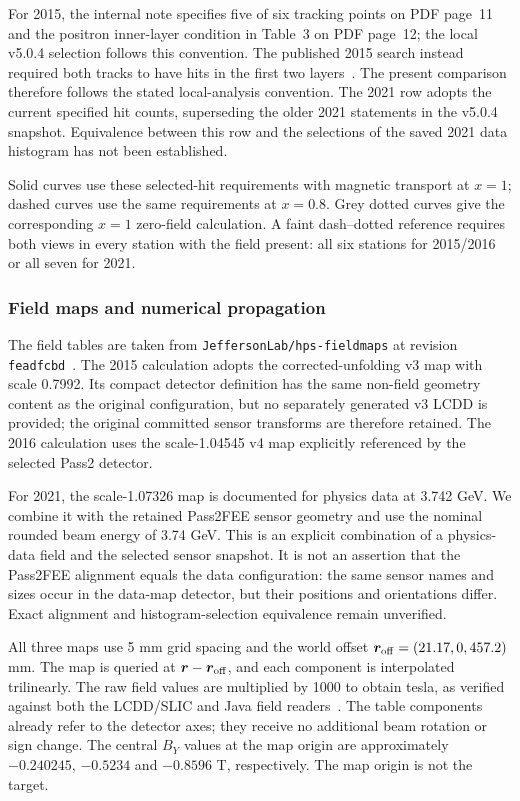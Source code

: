 For 2015, the internal note specifies five of six tracking points on PDF
page~11 and the positron inner-layer condition in Table~3 on PDF page~12;
the local v5.0.4 selection follows this convention. The published 2015
search instead required both tracks to have hits in the first two
layers~\cite{v571:HPS2015}. The present comparison therefore follows the
stated local-analysis convention. The 2021 row adopts the current specified
hit counts, superseding the older 2021 statements in the v5.0.4 snapshot.
Equivalence between this row and the selections of the saved 2021 data
histogram has not been established.

Solid curves use these selected-hit requirements with magnetic transport at
$x=1$; dashed curves use the same requirements at $x=0.8$. Grey dotted curves
give the corresponding $x=1$ zero-field calculation. A faint dash--dotted
reference requires both views in every station with the field present:
all six stations for 2015/2016 or all seven for 2021.

\subsubsection{Field maps and numerical propagation}
\label{v571:field-model}
The field tables are taken from \texttt{JeffersonLab/hps-fieldmaps} at
revision \texttt{feadfcbd}~\cite{v571:fieldmaps}. The 2015 calculation adopts
the corrected-unfolding v3 map with scale 0.7992. Its compact detector
definition has the same non-field geometry content as the original
configuration, but no separately generated v3 LCDD is provided; the original
committed sensor transforms are therefore retained. The 2016 calculation
uses the scale-1.04545 v4 map explicitly referenced by the selected Pass2
detector.

For 2021, the scale-1.07326 map is documented for physics data at 3.742 GeV.
We combine it with the retained Pass2FEE sensor geometry and use the nominal
rounded beam energy of 3.74 GeV. This is an explicit combination of a
physics-data field and the selected sensor snapshot. It is not an assertion
that the Pass2FEE alignment equals the data configuration: the same sensor
names and sizes occur in the data-map detector, but their positions and
orientations differ. Exact alignment and histogram-selection equivalence
remain unverified.

All three maps use 5 mm grid spacing and the world offset
$\boldsymbol r_{\rm off}=(21.17,0,457.2)$ mm. The map is queried at
$\boldsymbol r-\boldsymbol r_{\rm off}$, and each component is interpolated
trilinearly. The raw field values are multiplied by 1000 to obtain tesla,
as verified against both the LCDD/SLIC and Java field readers~\cite{v571:fieldreaders}.
The table components already refer to the detector axes; they receive no
additional beam rotation or sign change. The central $B_Y$ values at the
map origin are approximately $-0.240245$, $-0.5234$ and $-0.8596$ T,
respectively. The map origin is not the target.

